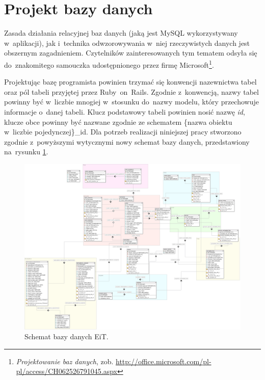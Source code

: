 \documentclass[a4paper,12pt,oneside]{report}
\begin{document}
\section{Projekt bazy danych}
\label{sec:db-projekt}
Zasada działania relacyjnej baz danych (jaką jest MySQL wykorzystywany w~aplikacji), jak i~technika odwzorowywania w~niej rzeczywistych danych jest obszernym zagadnieniem. Czytelników zainteresowanych tym tematem odsyła się do~znakomitego samouczka udostępnionego przez firmę Microsoft\footnote{\emph{Projektowanie baz danych}, zob. \url{http://office.microsoft.com/pl-pl/access/CH062526791045.aspx}}.

Projektując bazę programista powinien trzymać się konwencji nazewnictwa tabel oraz pól tabeli przyjętej przez Ruby~on~Rails. Zgodnie z~konwencją, nazwy tabel powinny być w~liczbie mnogiej w~stosunku do~nazwy modelu, który przechowuje informacje o~danej tabeli. Klucz podstawowy tabeli powinien nosić nazwę \emph{id}, klucze obce powinny być nazwane zgodnie ze schematem \{nazwa obiektu w~liczbie pojedynczej\}\_id. Dla potrzeb realizacji niniejszej pracy stworzono zgodnie z~powyższymi wytycznymi nowy schemat bazy danych, przedstawiony na~rysunku \ref{fig:database}.

\newpage
\thispagestyle{empty}
\addtolength{\textwidth}{4cm}
\addtolength{\hoffset}{-2.5cm}
\addtolength{\textheight}{5cm}
\addtolength{\voffset}{-3.5cm}
\begin{landscape}
\begin{figure}
\centering
  \includegraphics{database.png}
  \caption{
  Schemat bazy danych EiT.
  \label{fig:database}
  }
\end{figure}
\end{landscape}
\newpage
\end{document}

